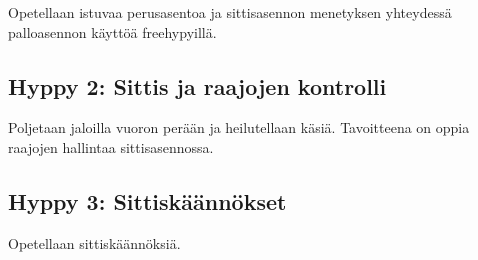 Opetellaan istuvaa perusasentoa ja sittisasennon menetyksen yhteydessä palloasennon käyttöä freehypyillä. 

\subsection{ Hyppy 2: Sittis ja raajojen kontrolli }
\label{free-hyppaaminen-hyppy-2-sittis-ja-raajojen-kontrolli}


Poljetaan jaloilla vuoron perään ja heilutellaan käsiä. Tavoitteena on oppia raajojen hallintaa sittisasennossa. 

\subsection{ Hyppy 3: Sittiskäännökset }
\label{free-hyppaaminen-hyppy-3-sittiskaannokset}


Opetellaan sittiskäännöksiä. 

